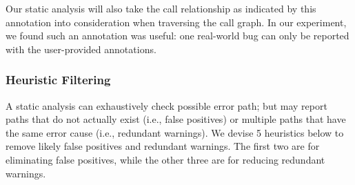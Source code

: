 {}


Our static analysis will also take the call relationship as indicated by this
annotation into consideration when traversing the call graph. In our experiment,
we found such an annotation was useful: one real-world bug can only be reported
with the user-provided annotations.

\subsubsection{Heuristic Filtering}
\label{sec:heuristic}

A static analysis can exhaustively check possible error path; but may report
paths that do not actually exist (i.e., false positives) or multiple paths
 that have the same error cause (i.e., redundant warnings). We devise
5 heuristics below to remove likely false positives and redundant warnings.
The first two are for eliminating false positives, while the
other three are for reducing redundant warnings.



